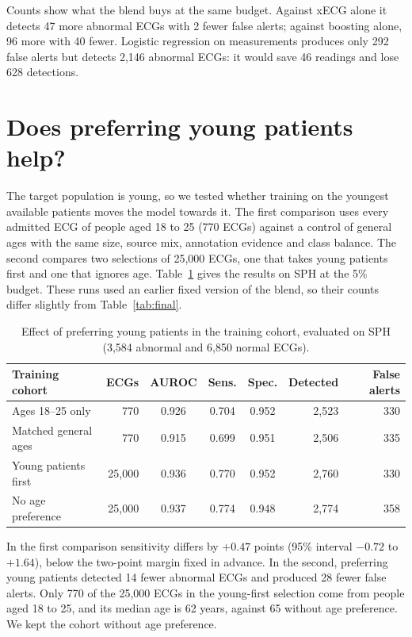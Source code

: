 \documentclass[letterpaper,11pt]{article}
\begin{document}
Counts show what the blend buys at the same budget. Against xECG alone it detects 47 more abnormal ECGs with 2 fewer false alerts; against boosting alone, 96 more with 40 fewer. Logistic regression on measurements produces only 292 false alerts but detects 2,146 abnormal ECGs: it would save 46 readings and lose 628 detections.

\section{Does preferring young patients help?}
\label{app:age}

The target population is young, so we tested whether training on the youngest available patients moves the model towards it. The first comparison uses every admitted ECG of people aged 18 to 25 (770 ECGs) against a control of general ages with the same size, source mix, annotation evidence and class balance. The second compares two selections of 25,000 ECGs, one that takes young patients first and one that ignores age. Table~\ref{tab:age} gives the results on SPH at the 5\% budget. These runs used an earlier fixed version of the blend, so their counts differ slightly from Table~\ref{tab:final}.

\begin{table}[H]
  \centering
  \caption{Effect of preferring young patients in the training cohort, evaluated on SPH (3,584 abnormal and 6,850 normal ECGs).}
  \label{tab:age}
  \small
  \begin{tabular}{lrcccrr}
    \toprule
    Training cohort & ECGs & AUROC & Sens. & Spec. & Detected & False alerts \\
    \midrule
    Ages 18--25 only       &    770 & 0.926 & 0.704 & 0.952 & 2,523 & 330 \\
    Matched general ages   &    770 & 0.915 & 0.699 & 0.951 & 2,506 & 335 \\
    Young patients first   & 25,000 & 0.936 & 0.770 & 0.952 & 2,760 & 330 \\
    No age preference      & 25,000 & 0.937 & 0.774 & 0.948 & 2,774 & 358 \\
    \bottomrule
  \end{tabular}
\end{table}

In the first comparison sensitivity differs by $+0.47$ points (95\% interval $-0.72$ to $+1.64$), below the two-point margin fixed in advance. In the second, preferring young patients detected 14 fewer abnormal ECGs and produced 28 fewer false alerts. Only 770 of the 25,000 ECGs in the young-first selection come from people aged 18 to 25, and its median age is 62 years, against 65 without age preference. We kept the cohort without age preference.
\end{document}
